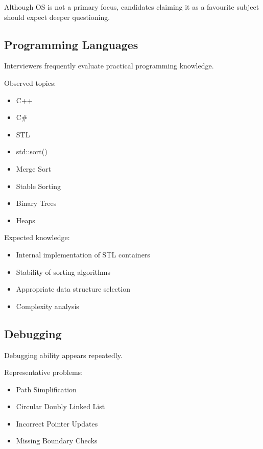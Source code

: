 \documentclass[11pt,a4paper]{article}
\begin{document}
Although OS is not a primary focus, candidates claiming it as a favourite subject should expect deeper questioning.


\subsection{Programming Languages}

Interviewers frequently evaluate practical programming knowledge.

Observed topics:

\begin{itemize}
	\item C++
	\item C\#
	\item STL
	\item std::sort()
	\item Merge Sort
	\item Stable Sorting
	\item Binary Trees
	\item Heaps
\end{itemize}

Expected knowledge:

\begin{itemize}
	\item Internal implementation of STL containers
	\item Stability of sorting algorithms
	\item Appropriate data structure selection
	\item Complexity analysis
\end{itemize}


\subsection{Debugging}

Debugging ability appears repeatedly.

Representative problems:

\begin{itemize}
	\item Path Simplification
	\item Circular Doubly Linked List
	\item Incorrect Pointer Updates
	\item Missing Boundary Checks
\end{itemize}
\end{document}
